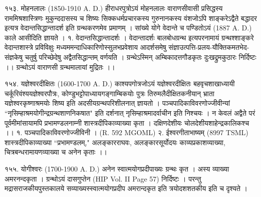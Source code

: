 १५३. मोहनलालः (1850-1910 A. D.)
हीराधरपुत्रोऽयं मोहनलालः वाराणसीवासी प्रसिद्धस्य राममिश्रशास्त्रिणः मुकुन्ददासस्य च शिष्यः सिक्कधर्मप्रचारकस्य गुरुनानकस्य वंशजोऽपि शाङ्करेऽद्वैते बद्धादर इत्यत्र वेदान्तसिद्धान्तादर्श इति ग्रन्थकरणमेव प्रमाणम् । सांख्ये योगे वेदान्ते च पण्डितोऽयं (1887 A. D.) काले आसीदिति ज्ञायते ।
१. वेदान्तसिद्धान्तादर्शः । वेदान्तादर्शः बालबोधग्रन्थ इत्यपरनामायं ग्रन्थश्शाङ्करे वेदान्तशास्त्रे प्रविविक्षुः मध्यममन्दाधिकारिणोस्सुलभप्रवेशाय आदर्शसमेषु संज्ञाउत्पत्ति-प्रलय-यौक्तिकमतभेद-संज्ञकेषु चतुर्षु परिच्छेदेषु अद्वैतसिद्धान्तम् वर्णयति । ग्रन्थेऽस्मिन् अम्बिकादत्तगौडकृतः दुःखद्रुमकुठारः निर्दिष्टः ।। ग्रन्थोऽयं वाराणसी ग्रन्थमालायां मुद्रितः ।।

१५४. यज्ञेश्वरदीक्षितः (1600-1700 A. D.)
काश्यपगोत्रजोऽयं यज्ञेश्वरदीक्षितः बहवृचशाखाध्यायी चर्कूरिवंश्ययज्ञेश्वरपौत्रः, कोण्डुभट्टोपाध्यायगङ्गाम्बिकयोः पुत्रः तिरुमलैदीक्षितकनीयान् भ्राता यज्ञेश्वरकृष्णाश्रमयोः शिष्य इति अदसीयग्रन्थपरिशीलनात् ज्ञायतो । पञ्चपादिकाविवरणोज्जीवीन्यां ``नृसिम्हाश्रमयोगीन्द्रग्रन्थशाणनिकषात" इति दर्शनात् नृसिम्हाश्रमादर्वाचीन इति निश्चयः । न केवलं अद्वैते परं पूर्वमीमांसायामपि प्रभामण्डलनाम्नी शास्त्रदीपिकाव्याख्या कृता । दक्षिणदेशीयः चोलदेशीयशाहेन्द्रकालिकश्च ।।
१. पञ्चपादिकाविवरणोज्जीविनी । (R. 592 MGOML)
२. ईश्वरगीताभाष्यम् (8997 TSML)
शास्त्रदीपिकाव्याख्या ``प्रभामण्डलम्," अलङ्कारराघवः, अलङ्कारसूर्योदयः काव्यप्रकाशव्याख्या, चित्रबन्धरामायणव्याख्या च अनेन कृताः ।।

१५५. योगीश्वरः (1700-1900 A. D.)
अनेन स्वात्मयोगप्रदीपाख्यः ग्रन्थः कृत । अस्य व्याख्या अमरनन्दकृता । ग्रन्थोऽयं दासगुप्तेन (HIP Vol. II Page 57) निर्दिष्टः । परन्तु मद्रासराजकीयपुस्तकालये सव्याख्यस्स्वात्मयोगप्रदीप अमरान्दकृत इति त्रयोदशशतकीय इति च दृश्यते ।

